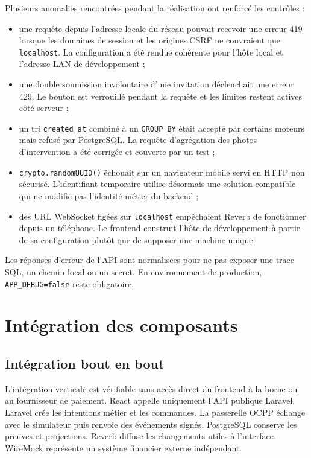 Plusieurs anomalies rencontrées pendant la réalisation ont renforcé les contrôles :

\begin{itemize}[leftmargin=7mm]
  \item une requête depuis l'adresse locale du réseau pouvait recevoir une erreur
  419 lorsque les domaines de session et les origines CSRF ne couvraient que
  \texttt{localhost}. La configuration a été rendue cohérente pour l'hôte local et
  l'adresse LAN de développement ;
  \item une double soumission involontaire d'une invitation déclenchait une erreur
  429. Le bouton est verrouillé pendant la requête et les limites restent actives
  côté serveur ;
  \item un tri \texttt{created\_at} combiné à un \texttt{GROUP BY} était accepté
  par certains moteurs mais refusé par PostgreSQL. La requête d'agrégation des
  photos d'intervention a été corrigée et couverte par un test ;
  \item \texttt{crypto.randomUUID()} échouait sur un navigateur mobile servi en
  HTTP non sécurisé. L'identifiant temporaire utilise désormais une solution
  compatible qui ne modifie pas l'identité métier du backend ;
  \item des URL WebSocket figées sur \texttt{localhost} empêchaient Reverb de
  fonctionner depuis un téléphone. Le frontend construit l'hôte de développement
  à partir de sa configuration plutôt que de supposer une machine unique.
\end{itemize}

Les réponses d'erreur de l'API sont normalisées pour ne pas exposer une trace SQL,
un chemin local ou un secret. En environnement de production,
\texttt{APP\_DEBUG=false} reste obligatoire.

\section{Intégration des composants}

\subsection{Intégration bout en bout}

L'intégration verticale est vérifiable sans accès direct du frontend à la borne
ou au fournisseur de paiement. React appelle uniquement l'API publique Laravel.
Laravel crée les intentions métier et les commandes. La passerelle OCPP échange
avec le simulateur puis renvoie des événements signés. PostgreSQL conserve les
preuves et projections. Reverb diffuse les changements utiles à l'interface.
WireMock représente un système financier externe indépendant.

